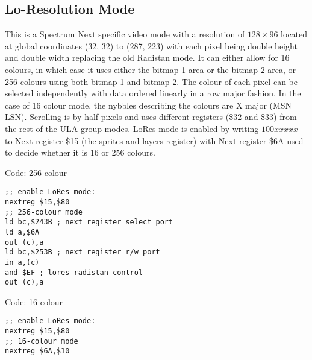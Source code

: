 \subsection{Lo-Resolution Mode}
This is a Spectrum Next specific video mode with a resolution of
$128\times96$ located at global coordinates (32, 32) to (287, 223)
with each pixel being double height and double width replacing the old
Radistan mode.  It can either allow for 16 colours, in which case it
uses either the bitmap 1 area or the bitmap 2 area, or 256 colours
using both bitmap 1 and bitmap 2. The colour of each pixel can be
selected independently with data ordered linearly in a row major
fashion. In the case of 16 colour mode, the nybbles describing the
colours are X major (MSN LSN). Scrolling is by half pixels and uses
different registers (\$32 and \$33) from the rest of the ULA group
modes. LoRes mode is enabled by writing $100xxxxx$ to Next register
\$15 (the sprites and layers register) with Next register \$6A used to
decide whether it is 16 or 256 colours.






Code: 256 colour
\begin{verbatim}
;; enable LoRes mode:
nextreg $15,$80
;; 256-colour mode
ld bc,$243B ; next register select port
ld a,$6A
out (c),a
ld bc,$253B ; next register r/w port
in a,(c)
and $EF ; lores radistan control
out (c),a
\end{verbatim}

Code: 16 colour
\begin{verbatim}
;; enable LoRes mode:
nextreg $15,$80
;; 16-colour mode
nextreg $6A,$10
\end{verbatim}
